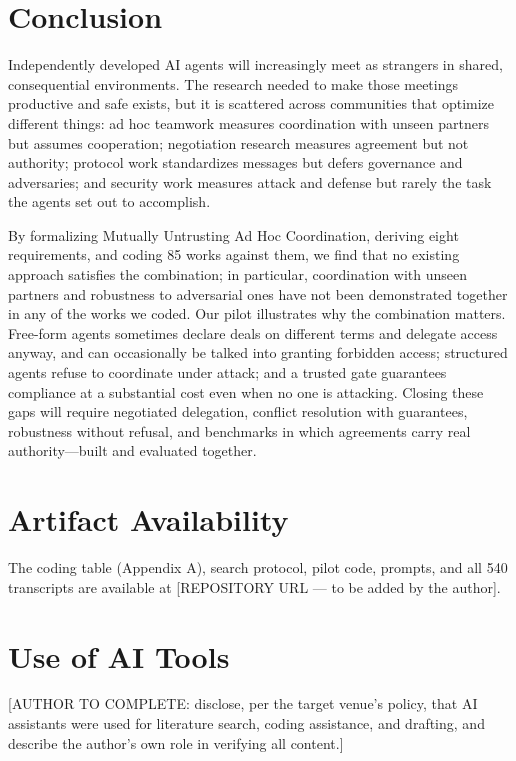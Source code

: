 \documentclass[conference]{IEEEtran}
\begin{document}
\section{Conclusion}\label{sec-11}

Independently developed AI agents will increasingly meet as strangers in shared, consequential environments. The research needed to make those meetings productive and safe exists, but it is scattered across communities that optimize different things: ad hoc teamwork measures coordination with unseen partners but assumes cooperation; negotiation research measures agreement but not authority; protocol work standardizes messages but defers governance and adversaries; and security work measures attack and defense but rarely the task the agents set out to accomplish.

By formalizing Mutually Untrusting Ad Hoc Coordination, deriving eight requirements, and coding 85 works against them, we find that no existing approach satisfies the combination; in particular, coordination with unseen partners and robustness to adversarial ones have not been demonstrated together in any of the works we coded. Our pilot illustrates why the combination matters. Free-form agents sometimes declare deals on different terms and delegate access anyway, and can occasionally be talked into granting forbidden access; structured agents refuse to coordinate under attack; and a trusted gate guarantees compliance at a substantial cost even when no one is attacking. Closing these gaps will require negotiated delegation, conflict resolution with guarantees, robustness without refusal, and benchmarks in which agreements carry real authority---built and evaluated together.

\section*{Artifact Availability}\label{artifact-availability}

The coding table (Appendix A), search protocol, pilot code, prompts, and all 540 transcripts are available at {[}REPOSITORY URL --- to be added by the author{]}.

\section*{Use of AI Tools}\label{use-of-ai-tools}

{[}AUTHOR TO COMPLETE: disclose, per the target venue's policy, that AI assistants were used for literature search, coding assistance, and drafting, and describe the author's own role in verifying all content.{]}
\end{document}
